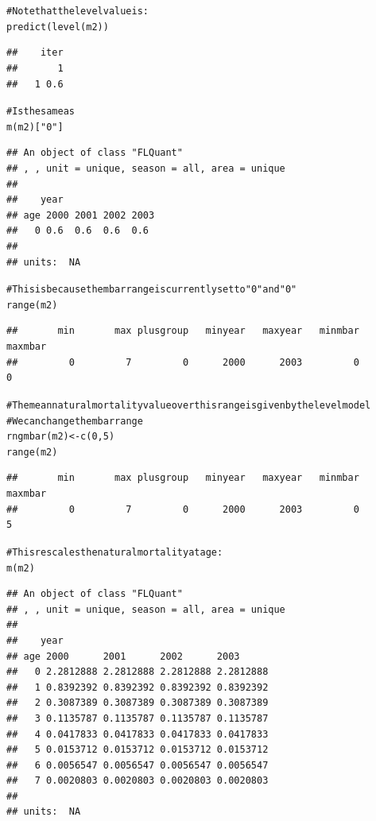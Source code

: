 \documentclass[a4paper,english,10pt]{article}\usepackage[]{graphicx}\usepackage[]{color}
\makeatletter
\newcommand{\hlnum}[1]{\textcolor[rgb]{0.2,0.2,0.2}{#1}}%
\newcommand{\hlstr}[1]{\textcolor[rgb]{0.2,0.2,0.2}{#1}}%
\newcommand{\hlcom}[1]{\textcolor[rgb]{0.2,0.267,0.4}{#1}}%
\newcommand{\hlstd}[1]{\textcolor[rgb]{0,0,0}{#1}}%
\newcommand{\hlkwb}[1]{\textcolor[rgb]{0.361,0.506,0.596}{#1}}%
\newcommand{\hlkwd}[1]{\textcolor[rgb]{0.361,0.506,0.596}{#1}}%
\newenvironment{kframe}{%
 \def\at@end@of@kframe{}%
 \ifinner\ifhmode%
  \def\at@end@of@kframe{\end{minipage}}%
  \begin{minipage}{\columnwidth}%
 \fi\fi%
 \def\FrameCommand##1{\hskip\@totalleftmargin \hskip-\fboxsep
 \colorbox{shadecolor}{##1}\hskip-\fboxsep
     \hskip-\linewidth \hskip-\@totalleftmargin \hskip\columnwidth}%
 \MakeFramed {\advance\hsize-\width
   \@totalleftmargin\z@ \linewidth\hsize
   \@setminipage}}%
 {\par\unskip\endMakeFramed%
 \at@end@of@kframe}
\newenvironment{knitrout}{}{} %
\makeatother
\begin{document}
\begin{knitrout}
\begin{kframe}
\begin{alltt}
\hlcom{# Note that the level value is:}
\hlkwd{predict}\hlstd{(}\hlkwd{level}\hlstd{(m2))}
\end{alltt}
\begin{verbatim}
##    iter
##       1
##   1 0.6
\end{verbatim}
\begin{alltt}
\hlcom{# Is the same as}
\hlkwd{m}\hlstd{(m2)[}\hlstr{"0"}\hlstd{]}
\end{alltt}
\begin{verbatim}
## An object of class "FLQuant"
## , , unit = unique, season = all, area = unique
## 
##    year
## age 2000 2001 2002 2003
##   0 0.6  0.6  0.6  0.6 
## 
## units:  NA
\end{verbatim}
\begin{alltt}
\hlcom{# This is because the mbar range is currently set to "0" and "0"}
\hlkwd{range}\hlstd{(m2)}
\end{alltt}
\begin{verbatim}
##       min       max plusgroup   minyear   maxyear   minmbar   maxmbar 
##         0         7         0      2000      2003         0         0
\end{verbatim}
\begin{alltt}
\hlcom{# The mean natural mortality value over this range is given by the level model}
\hlcom{# We can change the mbar range}
\hlkwd{rngmbar}\hlstd{(m2)}\hlkwb{<-} \hlkwd{c}\hlstd{(}\hlnum{0}\hlstd{,}\hlnum{5}\hlstd{)}
\hlkwd{range}\hlstd{(m2)}
\end{alltt}
\begin{verbatim}
##       min       max plusgroup   minyear   maxyear   minmbar   maxmbar 
##         0         7         0      2000      2003         0         5
\end{verbatim}
\begin{alltt}
\hlcom{# This rescales the natural mortality at age:}
\hlkwd{m}\hlstd{(m2)}
\end{alltt}
\begin{verbatim}
## An object of class "FLQuant"
## , , unit = unique, season = all, area = unique
## 
##    year
## age 2000      2001      2002      2003     
##   0 2.2812888 2.2812888 2.2812888 2.2812888
##   1 0.8392392 0.8392392 0.8392392 0.8392392
##   2 0.3087389 0.3087389 0.3087389 0.3087389
##   3 0.1135787 0.1135787 0.1135787 0.1135787
##   4 0.0417833 0.0417833 0.0417833 0.0417833
##   5 0.0153712 0.0153712 0.0153712 0.0153712
##   6 0.0056547 0.0056547 0.0056547 0.0056547
##   7 0.0020803 0.0020803 0.0020803 0.0020803
## 
## units:  NA
\end{verbatim}

\end{kframe}
\end{knitrout}
\end{document}
